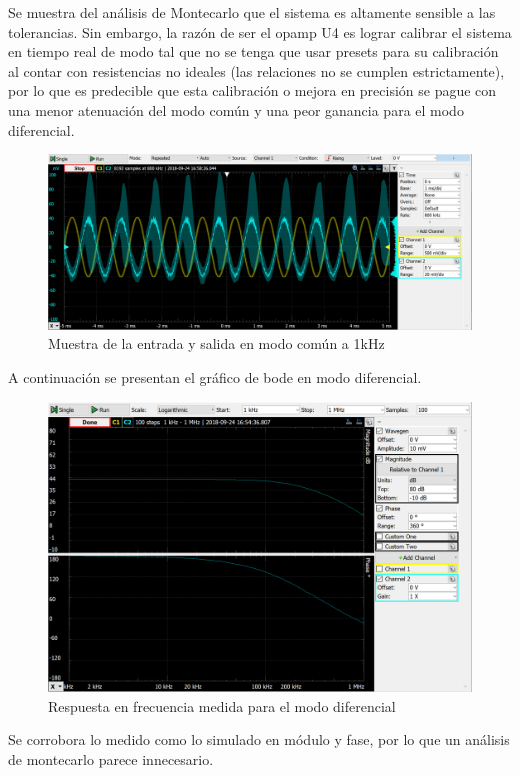 \documentclass[../../tc_tp3_main.tex]{subfiles}
\begin{document}
	Se muestra del análisis de Montecarlo que el sistema es altamente sensible a las tolerancias. Sin embargo, la razón de ser el opamp U4 es lograr calibrar el sistema en tiempo real de modo tal que no se tenga que usar presets para su calibración al contar con resistencias no ideales (las relaciones no se cumplen estrictamente), por lo que es predecible que esta calibración o mejora en precisión se pague con una menor atenuación del modo común y una peor ganancia para el modo diferencial.
			\begin{figure}[h!]	
		\centering
		\includegraphics[scale=0.6]{imagenes/ganancia_comun_medido.png}
		\caption{Muestra de la entrada y salida en modo común a 1kHz}
		\label{fig:ej3_ganancia_comun_medido}
	\end{figure}
	
	A continuación se presentan el gráfico de bode en modo diferencial.
	
	\begin{figure}[h!]	
		\centering
		\includegraphics[scale=0.6]{imagenes/bode_diferencial_medido.png}
		\caption{Respuesta en frecuencia medida para el modo diferencial}
		\label{fig:ej3_bode_diferencial_medido}
	\end{figure}
	Se corrobora lo medido como lo simulado en módulo y fase, por lo que un análisis de montecarlo parece innecesario.
	
\end{document}
